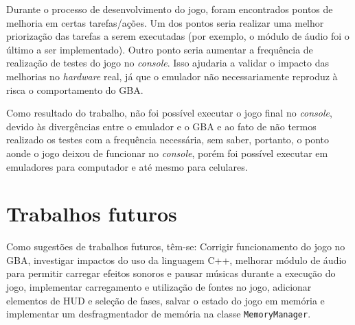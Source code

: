 Durante o processo de desenvolvimento do jogo, foram encontrados pontos de melhoria em certas tarefas/ações. Um dos pontos seria realizar uma melhor priorização das tarefas a serem executadas (por exemplo, o módulo de áudio foi o último a ser implementado). Outro ponto seria aumentar a frequência de realização de testes do jogo no \textit{console}. Isso ajudaria a validar o impacto das melhorias no \textit{hardware} real, já que o emulador não necessariamente reproduz à risca o comportamento do GBA.

Como resultado do trabalho, não foi possível executar o jogo final no \textit{console}, devido às divergências entre o emulador e o GBA e ao fato de não termos realizado os testes com a frequência necessária, sem saber, portanto, o ponto aonde o jogo deixou de funcionar no \textit{console}, porém foi possível executar em emuladores para computador e até mesmo para celulares.

\section{Trabalhos futuros}

Como sugestões de trabalhos futuros, têm-se: Corrigir funcionamento do jogo no GBA, investigar impactos do uso da linguagem C++, melhorar módulo de áudio para permitir carregar efeitos sonoros e pausar músicas durante a execução do jogo, implementar carregamento e utilização de fontes no jogo, adicionar elementos de HUD e seleção de fases, salvar o estado do jogo em memória e implementar um desfragmentador de memória na classe \texttt{MemoryManager}.
